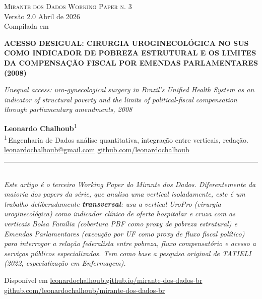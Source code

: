 \documentclass[12pt,a4paper,oneside]{article}
\begin{document}
\begin{titlepage}
  \begin{center}
    \vspace*{1.5cm}
    {\small\textsc{Mirante dos Dados \quad\textbar\quad Working Paper n. 3}}\\
    {\small Versão 2.0 \textemdash{} Abril de 2026}\\[2pt]
    {\footnotesize Compilada em \COMPILESTAMP\ \textbullet\ \texttt{\COMPILESHA}}

    \vfill

    {\LARGE\bfseries
     ACESSO DESIGUAL:
     CIRURGIA UROGINECOLÓGICA NO SUS
     COMO INDICADOR DE POBREZA ESTRUTURAL
     E OS LIMITES DA COMPENSAÇÃO FISCAL
     POR EMENDAS PARLAMENTARES
     (2008)}

    \vspace{1cm}
    {\large\itshape
     Unequal access: uro-gynecological surgery in Brazil's Unified
     Health System as an indicator of structural poverty and the
     limits of political-fiscal compensation through parliamentary
     amendments, 2008}

    \vfill

    {\large\textbf{Leonardo Chalhoub}\textsuperscript{1}}\\[6pt]
    {\small\textsuperscript{1}\,Engenharia de Dados \textemdash{}
     análise quantitativa, integração entre verticais, redação.}\\[6pt]
    {\small\href{mailto:leonardochalhoub@gmail.com}{leonardochalhoub@gmail.com}
     \quad\textbullet\quad
     \href{https://github.com/leonardochalhoub}{github.com/leonardochalhoub}}

    \vfill

    \rule{0.6\linewidth}{0.4pt}\\[6pt]
    {\small\textit{Este artigo é o terceiro Working Paper do Mirante dos
     Dados. Diferentemente da maioria dos papers da série, que
     analisa uma vertical isoladamente, este é um trabalho
     deliberadamente \textbf{transversal}: usa a vertical UroPro
     (cirurgia uroginecológica) como indicador clínico de oferta
     hospitalar e cruza com as verticais Bolsa Família (cobertura
     PBF como proxy de pobreza estrutural) e Emendas Parlamentares
     (execução por UF como proxy de fluxo fiscal político) para
     interrogar a relação federalista entre pobreza, fluxo
     compensatório e acesso a serviços públicos especializados.
     Tem como base a pesquisa original de TATIELI (2022,
     especialização em Enfermagem).}}

    \vspace{1cm}
    {\footnotesize
     Disponível em
     \href{https://leonardochalhoub.github.io/mirante-dos-dados-br/}%
     {leonardochalhoub.github.io/mirante-dos-dados-br}}\\[2pt]
    {\footnotesize
     \href{https://github.com/leonardochalhoub/mirante-dos-dados-br}%
     {github.com/leonardochalhoub/mirante-dos-dados-br}}
  \end{center}
\end{titlepage}
\end{document}
